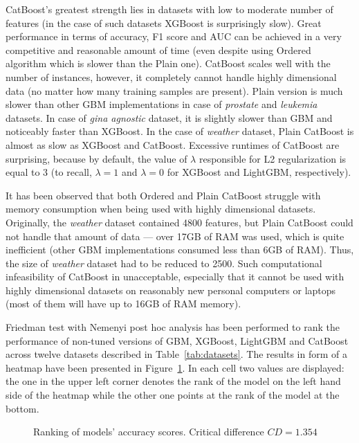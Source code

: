 \documentclass[magisterska, english]{pwr_wmat_praca_dyplomowa}
\theoremstyle{plain}
\numberwithin{theorem}{chapter}
\theoremstyle{definition}
\numberwithin{theorem}{chapter}
\begin{document}
CatBoost's greatest strength lies in datasets with low to moderate number of features (in the case of such datasets XGBoost is surprisingly slow). Great performance in terms of accuracy, F1 score and AUC can be achieved in a very competitive and reasonable amount of time (even despite using Ordered algorithm which is slower than the Plain one). CatBoost scales well with the number of instances, however, it completely cannot handle highly dimensional data (no matter how many training samples are present). Plain version is much slower than other GBM implementations in case of \emph{prostate} and \emph{leukemia} datasets. In case of \emph{gina agnostic} dataset, it is slightly slower than GBM and noticeably faster than XGBoost. In the case of \emph{weather} dataset, Plain CatBoost is almost as slow as XGBoost and CatBoost. Excessive runtimes of CatBoost are surprising, because by default, the value of $\lambda$ responsible for L2 regularization is equal to 3 (to recall, $\lambda=1$ and $\lambda=0$ for XGBoost and LightGBM, respectively).

It has been observed that both Ordered and Plain CatBoost struggle with memory consumption when being used with highly dimensional datasets. Originally, the \emph{weather} dataset contained 4800 features, but Plain CatBoost could not handle that amount of data --- over 17GB of RAM was used, which is quite inefficient (other GBM implementations consumed less than 6GB of RAM). Thus, the size of \emph{weather} dataset had to be reduced to 2500. Such computational infeasibility of CatBoost in unacceptable, especially that it cannot be used with highly dimensional datasets on reasonably new personal computers or laptops (most of them will have up to 16GB of RAM memory).

Friedman test with Nemenyi post hoc analysis has been performed to rank the performance of non-tuned versions of GBM, XGBoost, LightGBM and CatBoost across twelve datasets described in Table~\ref{tab:datasets}. The results in form of a heatmap have been presented in Figure~\ref{fig:no_tuning_accuracy_heatmap}. In each cell two values are displayed: the one in the upper left corner denotes the rank of the model on the left hand side of the heatmap while the other one points at the rank of the model at the bottom.

\begin{figure}[H]
	\centering
	\caption{Ranking of models' accuracy scores. Critical difference $CD = 1.354$}
	\label{fig:no_tuning_accuracy_heatmap}
\end{figure}
\end{document}

